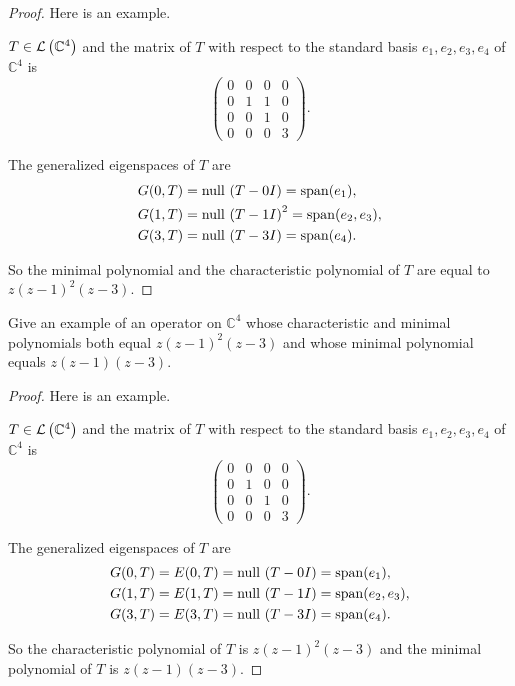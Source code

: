 \begin{proof}
    Here is an example.

    $T\in\mathcal{L}\left({\mathbb{C}^{4}}\right)$ and the matrix of $T$ with respect to the standard basis $e_{1}, e_{2}, e_{3}, e_{4}$ of $\mathbb{C}^{4}$ is
    \[
        \begin{pmatrix}
            0 & 0 & 0 & 0 \\
            0 & 1 & 1 & 0 \\
            0 & 0 & 1 & 0 \\
            0 & 0 & 0 & 3
        \end{pmatrix}.
    \]

    The generalized eigenspaces of $T$ are
    \begin{align*}
        G(0, T) & = \operatorname{null}\,{(T - 0I)} = \operatorname{span}(e_{1}),              \\
        G(1, T) & = \operatorname{null}\,{{(T - 1I)}^{2}} = \operatorname{span}(e_{2}, e_{3}), \\
        G(3, T) & = \operatorname{null}\,{(T - 3I)} = \operatorname{span}(e_{4}).
    \end{align*}

    So the minimal polynomial and the characteristic polynomial of $T$ are equal to $z{(z-1)}^{2}{(z-3)}$.
\end{proof}
\newpage

\begin{exercise}\label{chapter8:sectionB:exercise14}
    Give an example of an operator on $\mathbb{C}^{4}$ whose characteristic and minimal polynomials both equal $z{(z - 1)}^{2}(z - 3)$ and whose minimal polynomial equals $z(z - 1)(z - 3)$.
\end{exercise}

\begin{proof}
    Here is an example.

    $T\in\mathcal{L}\left({\mathbb{C}^{4}}\right)$ and the matrix of $T$ with respect to the standard basis $e_{1}, e_{2}, e_{3}, e_{4}$ of $\mathbb{C}^{4}$ is
    \[
        \begin{pmatrix}
            0 & 0 & 0 & 0 \\
            0 & 1 & 0 & 0 \\
            0 & 0 & 1 & 0 \\
            0 & 0 & 0 & 3
        \end{pmatrix}.
    \]

    The generalized eigenspaces of $T$ are
    \begin{align*}
        G(0, T) & = E(0, T) = \operatorname{null}\,{(T - 0I)} = \operatorname{span}(e_{1}),        \\
        G(1, T) & = E(1, T) = \operatorname{null}\,{(T - 1I)} = \operatorname{span}(e_{2}, e_{3}), \\
        G(3, T) & = E(3, T) = \operatorname{null}\,{(T - 3I)} = \operatorname{span}(e_{4}).
    \end{align*}

    So the characteristic polynomial of $T$ is $z{(z-1)}^{2}(z-3)$ and the minimal polynomial of $T$ is $z(z-1)(z-3)$.
\end{proof}
\newpage

